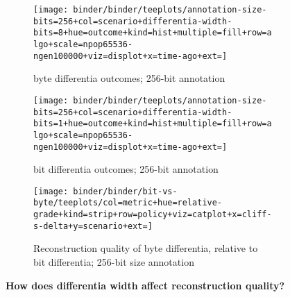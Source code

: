 \begin{figure*}
  \centering

\begin{minipage}{\textwidth}
\begin{subfigure}[b]{0.4\textwidth}
\centering
\texttt{[image: binder/binder/teeplots/annotation-size-bits=256+col=scenario+differentia-width-bits=8+hue=outcome+kind=hist+multiple=fill+row=algo+scale=npop65536-ngen100000+viz=displot+x=time-ago+ext=]}
\footnotesize
\caption{byte differentia outcomes; 256-bit annotation}
  \label{fig:bit-vs-byte-summary-byte-outcomes}
  \end{subfigure}%
\begin{subfigure}[b]{0.6\textwidth}
\centering
\texttt{[image: binder/binder/teeplots/annotation-size-bits=256+col=scenario+differentia-width-bits=1+hue=outcome+kind=hist+multiple=fill+row=algo+scale=npop65536-ngen100000+viz=displot+x=time-ago+ext=]}
\footnotesize
\caption{bit differentia outcomes; 256-bit annotation}
\label{fig:bit-vs-byte-summary-bit-outcomes}
\end{subfigure}
\end{minipage}
  \begin{subfigure}[b]{\textwidth}
    \centering
    \texttt{[image: binder/binder/bit-vs-byte/teeplots/col=metric+hue=relative-grade+kind=strip+row=policy+viz=catplot+x=cliff-s-delta+y=scenario+ext=]}
    \footnotesize
    \caption{Reconstruction quality of byte differentia, relative to bit differentia; 256-bit size annotation}
  \end{subfigure}%
\caption{%
  \textbf{How does differentia width affect reconstruction quality?}
}
\end{figure*}
